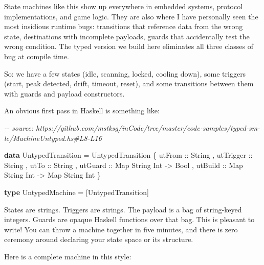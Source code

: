 \documentclass[]{article}
\newenvironment{Shaded}{}{}
\newcommand{\CommentTok}[1]{\textcolor[rgb]{0.38,0.63,0.69}{\textit{#1}}}
\newcommand{\DataTypeTok}[1]{\textcolor[rgb]{0.56,0.13,0.00}{#1}}
\newcommand{\KeywordTok}[1]{\textcolor[rgb]{0.00,0.44,0.13}{\textbf{#1}}}
\newcommand{\NormalTok}[1]{#1}
\newcommand{\OtherTok}[1]{\textcolor[rgb]{0.00,0.44,0.13}{#1}}
\begin{document}
State machines like this show up everywhere in embedded systems, protocol
implementations, and game logic. They are also where I have personally seen the
most insidious runtime bugs: transitions that reference data from the wrong
state, destinations with incomplete payloads, guards that accidentally test the
wrong condition. The typed version we build here eliminates all three classes of
bug at compile time.

So: we have a few states (idle, scanning, locked, cooling down), some triggers
(start, peak detected, drift, timeout, reset), and some transitions between them
with guards and payload constructors.

An obvious first pass in Haskell is something like:

\begin{Shaded}
\begin{Highlighting}[]
\CommentTok{{-}{-} source: https://github.com/mstksg/inCode/tree/master/code{-}samples/typed{-}sm{-}lc/MachineUntyped.hs\#L8{-}L16}

\KeywordTok{data} \DataTypeTok{UntypedTransition} \OtherTok{=} \DataTypeTok{UntypedTransition}
\NormalTok{  \{}\OtherTok{ utFrom    ::} \DataTypeTok{String}
\NormalTok{  ,}\OtherTok{ utTrigger ::} \DataTypeTok{String}
\NormalTok{  ,}\OtherTok{ utTo      ::} \DataTypeTok{String}
\NormalTok{  ,}\OtherTok{ utGuard   ::} \DataTypeTok{Map} \DataTypeTok{String} \DataTypeTok{Int} \OtherTok{{-}\textgreater{}} \DataTypeTok{Bool}
\NormalTok{  ,}\OtherTok{ utBuild   ::} \DataTypeTok{Map} \DataTypeTok{String} \DataTypeTok{Int} \OtherTok{{-}\textgreater{}} \DataTypeTok{Map} \DataTypeTok{String} \DataTypeTok{Int}
\NormalTok{  \}}

\KeywordTok{type} \DataTypeTok{UntypedMachine} \OtherTok{=}\NormalTok{ [}\DataTypeTok{UntypedTransition}\NormalTok{]}
\end{Highlighting}
\end{Shaded}

States are strings. Triggers are strings. The payload is a bag of string-keyed
integers. Guards are opaque Haskell functions over that bag. This is pleasant to
write! You can throw a machine together in five minutes, and there is zero
ceremony around declaring your state space or its structure.

Here is a complete machine in this style:
\end{document}
